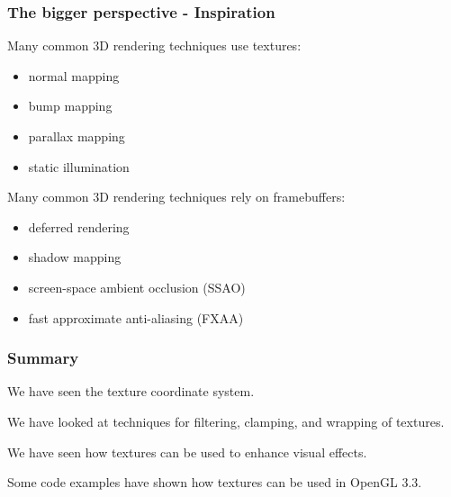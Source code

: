 \documentclass{beamer}
\begin{document}
%
%
%
\begin{frame}
\frametitle{The bigger perspective - Inspiration}
Many common 3D rendering techniques use textures:

\begin{itemize}
\item normal mapping
\item bump mapping
\item parallax mapping
\item static illumination
\end{itemize}

\vspace{4mm}
Many common 3D rendering techniques rely on framebuffers:

\begin{itemize}
\item deferred rendering
\item shadow mapping
\item screen-space ambient occlusion (SSAO)
\item fast approximate anti-aliasing (FXAA)
\end{itemize}

\end{frame}


%
%
%
\begin{frame}
\frametitle{Summary}
We have seen the texture coordinate system.

\vspace{5mm}
We have looked at techniques for filtering, clamping, and wrapping
of textures.

\vspace{5mm}
We have seen how textures can be used to enhance visual effects.

\vspace{5mm}
Some code examples have shown how textures can be used in OpenGL 3.3.
\end{frame}


%
%
%
\end{document}

